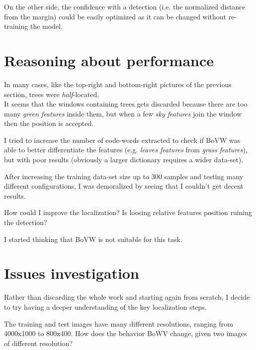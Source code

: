 \documentclass[]{report}
\begin{document}
On the other side, the confidence with a detection (i.e. the normalized distance from the margin) could be easily optimized as it can be changed without re-training the model.

\section{Reasoning about performance}
In many cases, like the top-right and bottom-right pictures of the previous section, trees were \textit{half}-located. 
\\
It seems that the windows containing trees gets discarded because there are too many \textit{green features} inside them, but when a few \textit{sky features} join the window then the position is accepted.

I tried to increase the number of code-words extracted to check if BoVW was able to better differentiate the features (e.g.  \textit{leaves features} from \textit{grass features}), but with poor results (obviously a larger dictionary requires a wider data-set).

After increasing the training data-set size up to 300 samples and testing many different configurations, I was demoralized by seeing that I couldn't get decent results.

How could I improve the localization? Is loosing relative features position ruining the detection?

I started thinking that BoVW is not suitable for this task.

\section{Issues investigation}
Rather than discarding the whole work and starting again from scratch, I decide to try having a deeper understanding of the key localization steps.

The training and test images have many different resolutions, ranging from 4000x1000 to 800x400. How does the behavior BoWV change, given two images of different resolution?
\end{document}
